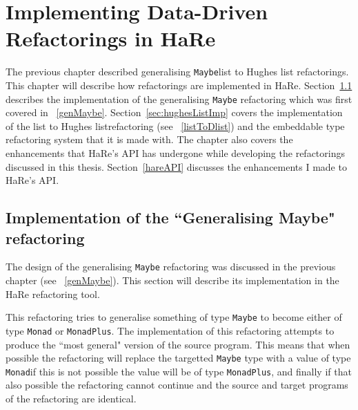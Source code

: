 \chapter{Implementing Data-Driven Refactorings in HaRe}
\DIFdelbegin %
\DIFdelend \DIFaddbegin \label{chp:generalImp}
\DIFaddend 

\renewcommand{\topfraction}{1}
\renewcommand{\floatpagefraction}{1}

The previous chapter described \DIFdelbegin {}\DIFdelend \DIFaddbegin {}\DIFaddend generalising \texttt{Maybe}\DIFdelbegin {}\DIFdelend \DIFaddbegin {}\DIFaddend list to Hughes list refactorings\DIFaddbegin {}\DIFaddend . This chapter will describe how refactorings are implemented in HaRe. Section~\ref{sec:genMaybeImp} describes the implementation of the generalising \texttt{Maybe} refactoring which was first covered in \DIFdelbegin {}\DIFdelend \DIFaddbegin {}\DIFaddend ~\ref{genMaybe}. Section~\ref{sec:hughesListImp} covers the implementation of the \DIFaddbegin {}\DIFaddend list to Hughes list\DIFaddbegin {}\DIFaddend refactoring (see \DIFdelbegin {}\DIFdelend \DIFaddbegin {}\DIFaddend ~\ref{listToDlist}) and the embeddable type refactoring system that it is made with. The chapter also covers the enhancements that HaRe's API has undergone while developing the refactorings discussed in this thesis. Section~\ref{hareAPI} discusses the enhancements I made to HaRe's API.

\section{Implementation of the ``Generalising Maybe" refactoring}
\label{sec:genMaybeImp}

The design of the generalising \texttt{Maybe} refactoring was discussed in the previous chapter (see \DIFdelbegin {}\DIFdelend \DIFaddbegin {}\DIFaddend ~\ref{genMaybe}). This section will describe its implementation in the HaRe refactoring tool. 

This refactoring tries to generalise something of type \texttt{Maybe} to become either of type \texttt{Monad} or \texttt{MonadPlus}. The implementation of this refactoring attempts to produce the ``most general" version of the source program. This means that when possible the refactoring will replace the targetted \texttt{Maybe} type with a value of type \texttt{Monad}\DIFdelbegin \DIFdel{, }\DIFdelend \DIFaddbegin \DIFadd{; }\DIFaddend if this is not possible the value will be of type \texttt{MonadPlus}, and finally if that also \DIFdelbegin {}\DIFdelend \DIFaddbegin {}\DIFaddend possible the refactoring cannot continue and the source and target programs of the refactoring are identical.

